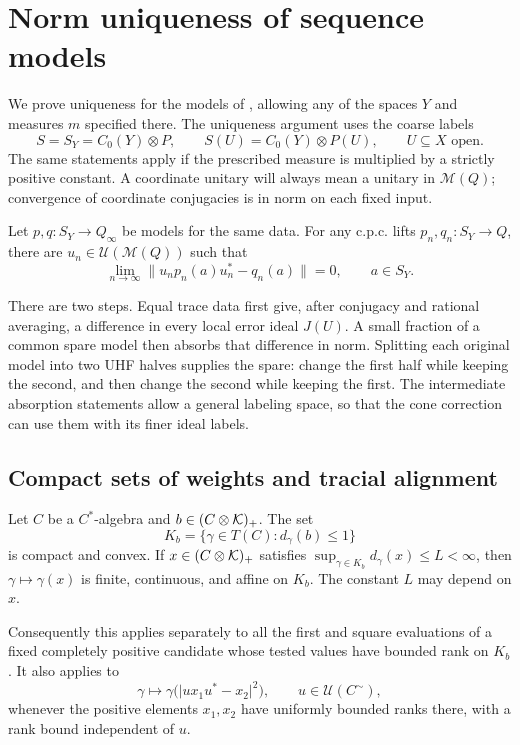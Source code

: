 \section{Norm uniqueness of sequence models}\label{sec:uniqueness}

We prove uniqueness for the models of , allowing any of
the spaces $Y$ and measures $m$ specified there.  The uniqueness
argument uses the coarse labels
\[
 S=S_Y=C_0(Y)\otimes P,\qquad S(U)=C_0(Y)\otimes P(U),
 \qquad U\subseteq X\text{ open}.
\]
The same statements apply if the prescribed measure is multiplied by a
strictly positive constant.  A coordinate unitary will always mean a
unitary in $\mathcal M(Q)$; convergence of coordinate conjugacies is in
norm on each fixed input.
\begin{theorem}\label{un:uniqueness}
Let $p,q:S_Y\to Q_\infty$ be models for the same data.  For any
c.p.c. lifts $p_n,q_n:S_Y\to Q$, there are
$u_n\in\mathcal U(\mathcal M(Q))$ such that
\[
 \lim_{n\to\infty}\|u_np_n(a)u_n^*-q_n(a)\|=0,
 \qquad a\in S_Y.
\]
\end{theorem}

There are two steps.  Equal trace data first give, after conjugacy and
rational averaging, a difference in every local error ideal $J(U)$.
A small fraction of a common spare model then absorbs that difference
in norm.  Splitting each original model into two UHF halves supplies
the spare: change the first half while keeping the second, and then
change the second while keeping the first.  The intermediate absorption
statements allow a general labeling space, so that the cone correction
can use them with its finer ideal labels.

\subsection{Compact sets of weights and tracial alignment}

\begin{lemma}\label{un:trace-cap}
Let $C$ be a $C^*$-algebra and $b\in(C\otimes\mathcal K)_+$.  The set
\[
 K_b=\{\gamma\in T(C):d_\gamma(b)\leq1\}
\]
is compact and convex.  If $x\in(C\otimes\mathcal K)_+$ satisfies
$\sup_{\gamma\in K_b}d_\gamma(x)\leq L<\infty$, then
$\gamma\mapsto\gamma(x)$ is finite, continuous, and affine on $K_b$.
The constant $L$ may depend on $x$.

Consequently this applies separately to all the first and square
evaluations of a fixed completely positive candidate whose tested
values have bounded rank on $K_b$.  It also applies to
\[
 \gamma\longmapsto
 \gamma\bigl(\lvert u x_1u^*-x_2\rvert^2\bigr),
 \qquad u\in\mathcal U(C^{\sim}),
\]
whenever the positive elements $x_1,x_2$ have uniformly bounded ranks
there, with a rank bound independent of $u$.
\end{lemma}

